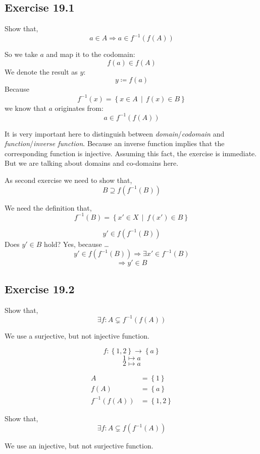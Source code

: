\documentclass[a4paper]{article}
\theoremstyle{definition}
\newcommand\set[1]{\left\{#1\right\}}
\newcommand\setdef[2]{\left\{#1\,\middle|\,#2\right\}}
\begin{document}
\subsection{Exercise 19.1}


Show that,
\[ a \in A \Rightarrow a \in f^{-1}(f(A)) \]

So we take $a$ and map it to the codomain:
\[ f(a) \in f(A) \]
We denote the result as $y$:
\[ y \coloneqq f(a) \]
Because
\[ f^{-1}(x) = \setdef{x \in A}{f(x) \in B} \]
we know that $a$ originates from:
\[ a \in f^{-1}(f(A)) \]

It is very important here to distinguish between \emph{domain}/\emph{codomain}
and \emph{function}/\emph{inverse function}. Because an inverse function implies
that the corresponding function is injective. Assuming this fact, the exercise
is immediate. But we are talking about domains and co-domains here.

As second exercise we need to show that,
\[ B \supseteq f\left(f^{-1}\left(B\right)\right) \]

We need the definition that,
\[ f^{-1}(B) = \setdef{x' \in X}{f(x') \in B} \]

\[ y' \in f(f^{-1}(B)) \]
Does $y' \in B$ hold? Yes, because \dots
\[ y' \in f\left(f^{-1}(B)\right) \Rightarrow \exists x' \in f^{-1}(B) \]
\[ \Rightarrow y' \in B \]

\subsection{Exercise 19.2}

Show that,
\[ \exists f: A \subsetneq f^{-1}(f(A)) \]

We use a surjective, but not injective function.

\[ f: \set{1,2} \rightarrow \set{a} \]
\[ 1 \mapsto a \]
\[ 2 \mapsto a \]

\begin{align*}
  A &= \set{1} \\
  f(A) &= \set{a} \\
  f^{-1}(f(A)) &= \set{1, 2}
\end{align*}

Show that,
\[ \exists f: A \subsetneq f(f^{-1}(A)) \]

We use an injective, but not surjective function.
\end{document}
